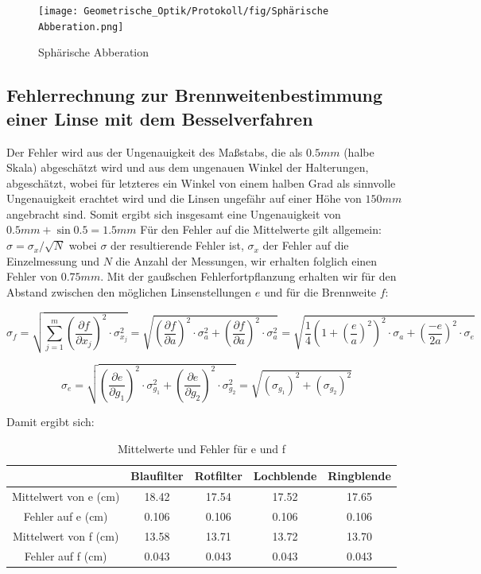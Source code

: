 \begin{figure}[h!]
    \centering
    \texttt{[image: Geometrische\_Optik/Protokoll/fig/Sphärische Abberation.png]}
    \caption{Sphärische Abberation}
    \label{fig:Sphärische Abberation}
\end{figure}

\clearpage

\subsection{Fehlerrechnung zur Brennweitenbestimmung einer Linse mit dem Besselverfahren}
Der Fehler wird aus der Ungenauigkeit des Maßstabs, die als $0.5mm$ (halbe Skala) abgeschätzt wird und aus dem ungenauen Winkel der Halterungen, abgeschätzt, wobei für letzteres ein Winkel von einem halben Grad als sinnvolle Ungenauigkeit erachtet wird und die Linsen ungefähr auf einer Höhe von $150mm$ angebracht sind. Somit ergibt sich insgesamt eine Ungenauigkeit von $0.5mm + \sin{0.5} = 1.5mm$
Für den Fehler auf die Mittelwerte gilt allgemein: $\sigma = \sigma_x / \sqrt{N}$ wobei $\sigma$ der resultierende Fehler ist, $\sigma_x$ der Fehler auf die Einzelmessung und $N$ die Anzahl der Messungen, wir erhalten folglich einen Fehler von $0.75mm$.
Mit der gaußschen Fehlerfortpflanzung erhalten wir für den Abstand zwischen den möglichen Linsenstellungen $e$ und für die Brennweite $f$:

\begin{equation}
    \sigma_f = \sqrt{\sum_{j=1}^m(\frac{\partial f}{\partial x_j})^2 \cdot \sigma_{x_j}^2} 
    =\sqrt{(\frac{\partial f}{\partial a})^2 \cdot \sigma_{a}^2 + (\frac{\partial f}{\partial a})^2 \cdot \sigma_{a}^2} 
    =\sqrt{\frac{1}{4}(1+(\frac{e}{a})^2)^2 \cdot \sigma_a + (\frac{-e}{2a})^2 \cdot \sigma_e}
\end{equation}

\begin{equation}
    \sigma_e
    =\sqrt{(\frac{\partial e}{\partial g_1})^2 \cdot \sigma_{g_1}^2 + (\frac{\partial e}{\partial g_2})^2 \cdot \sigma_{g_2}^2} 
    =\sqrt{(\sigma_{g_1})^2 + (\sigma_{g_2})^2}
\end{equation}

Damit ergibt sich:\\

\begin{table}[h!]
    \centering
\begin{tabular}{|c|c|c|c|c|}
	\hline
	& Blaufilter & Rotfilter & Lochblende & Ringblende \\
	\hline
	Mittelwert von e (cm) & 18.42 & 17.54 & 17.52 & 17.65 \\
	\hline
	Fehler auf e (cm) & 0.106 & 0.106 & 0.106 & 0.106 \\
	\hline
	Mittelwert von f (cm) & 13.58 & 13.71 & 13.72 & 13.70 \\
	\hline
	Fehler auf f (cm) & 0.043 & 0.043 & 0.043 & 0.043 \\
	\hline
\end{tabular}
    \caption{Mittelwerte und Fehler für e und f}
    \label{tab:Mittelwerte}
\end{table}

